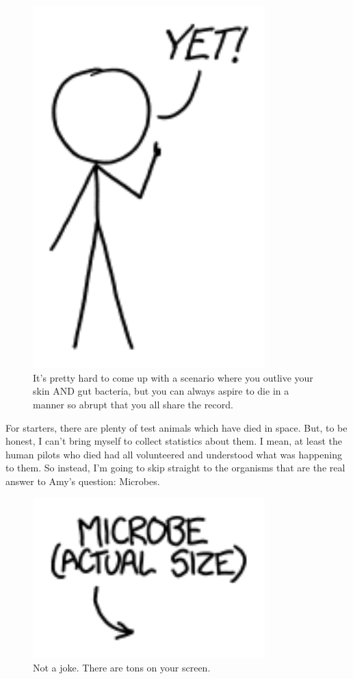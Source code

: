 {\begin{figure}[!htbp]
\centering
\includegraphics[scale=0.5, max width=0.8\textwidth]{imgs/a/117/yet.png}
\caption{It's pretty hard to come up with a scenario where you outlive your skin AND gut bacteria, but you can always aspire to die in a manner so abrupt that you all share the record.}
\end{figure}

{For starters, there are plenty of test animals which have died in space. But, to be honest, I can't bring myself to collect statistics about them. I mean, at least the human pilots who died had all volunteered and understood what was happening to them. So instead, I'm going to skip straight to the organisms that are the real answer to Amy's question: Microbes.}

\begin{figure}[!htbp]
\centering
\includegraphics[scale=0.5, max width=0.8\textwidth]{imgs/a/117/microbe.png}
\caption{Not a joke. There are tons on your screen.}
\end{figure}

}
